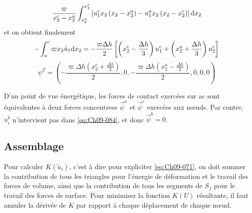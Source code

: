 \[
\frac{\varpi}{x_2^c -x_2^a} \int_{x_2^a}^{x_2^c} \left[ u_1^c x_2 \left( x_2 - x_2^a \right) - u_1^a x_2 \left( x_2 - x_2^c \right) \right] \mathrm{d} x_2
\]
et on obtient finalement
\begin{equation}
    - \int_{a}^c \varpi x_2 \tilde{u}_1 \mathrm{d} x_2 = - \frac{\varpi \Delta h}{2} \left[ \left( x_2^c - \frac{\Delta h}{3} \right) u_1^c + \left( x_2^a + \frac{\Delta h}{3} \right) u_2^c \right]
    \label{eq:Ch09-085}
\end{equation}
\begin{equation}
    \underline{\psi}^T = \left( - \frac{\varpi \Delta h \left( x_2^c + \frac{\Delta h}{3} \right)}{2}, 0, - \frac{\varpi \Delta h \left( x_2^a - \frac{\Delta h}{3} \right)}{2}, 0, 0, 0 \right)
    \label{eq:Ch09-086}
\end{equation}

D'un point de vue énergétique, les forces de contact exercées sur  ac sont équivalentes à deux forces concentrees  $\vec{\psi}^a$ et $\vec{\psi}^c$ exercées aux nœuds.
Par contre,  $u_i^b$ n'intervient pas dans \eqref{eq:Ch09-084}, et donc $\vec{\psi}^b=0$.

\subsection{Assemblage} \label{ssec:Ch09-3.4}
Pour calculer $K \left( \tilde{u}_i \right)$, c'est à dire pour expliciter \eqref{eq:Ch09-071}, on doit sommer la contribution de tous les triangles pour l'énergie de déformation et le travail des forces de volume, ainsi que la contribution de tous les segments de $S_f$ pour le travail des forces de surface.
Pour minimiser la fonction $K\left( \underline{U} \right)$ résultante, il faut annuler la dérivée de $K$ par rapport à chaque déplacement de chaque nœud. 
